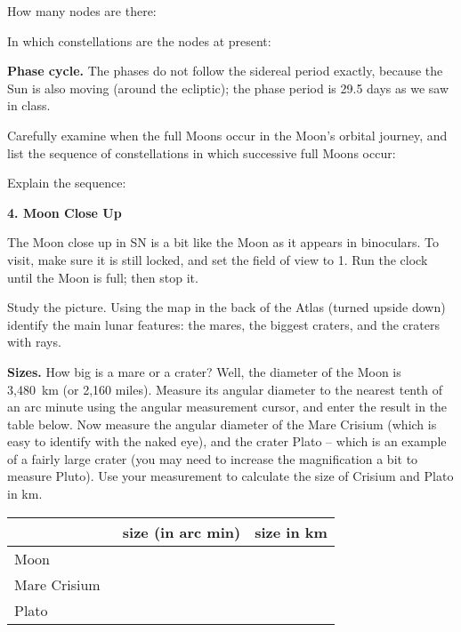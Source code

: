 \medskip
How many nodes are there: \makebox[2cm]{\hrulefill}

In which constellations are the nodes at present:
\makebox[2cm]{\hrulefill}
 
\medskip\noindent
{\bf Phase cycle.} The phases do not follow the sidereal period
exactly, because the Sun is also
moving (around the ecliptic); the phase period is 29.5 days as we saw
in class.

Carefully examine when the full Moons occur in the Moon's orbital
journey, and list the sequence of constellations in which successive
full Moons occur: \\
\makebox[12cm]{\hrulefill}

Explain the sequence: \makebox[12cm]{\hrulefill}

\bigskip
\bigskip
\noindent
{\bf 4. Moon Close Up} 

\medskip
\noindent
The Moon close up in SN is a bit like the Moon as it appears in
binoculars. To visit, make sure it is still locked, and set the field
of view to 1\deg. Run the clock until the Moon is full; then stop it.

\noindent Study the picture. Using the map in the back of the Atlas (turned
upside down) identify the main lunar features: the mares, the biggest
craters, and the craters with rays.

\medskip
\noindent
{\bf Sizes.}
How big is a mare or a crater? Well, the diameter of the Moon is
3,480~km (or 2,160 miles). Measure its angular diameter to the nearest
tenth of an arc minute using the angular measurement cursor, and enter
the result in the table below. Now measure the angular diameter of the
Mare Crisium (which is easy to identify with the naked eye), and the
crater Plato -- which is an example of a fairly large crater (you may
need to increase the magnification a bit to measure Pluto). Use your
measurement to calculate the size of Crisium and Plato in km.



\bigskip
\begin{center}
\begin{tabular}{lcc} \hline
     & \  size (in arc min) &\hspace{1.5cm} size in km  \\
 \hline
Moon           &  &       \\ \hline
Mare Crisium   &  &       \\ \hline
Plato          &  &       \\ \hline
\end{tabular}
\end{center}

